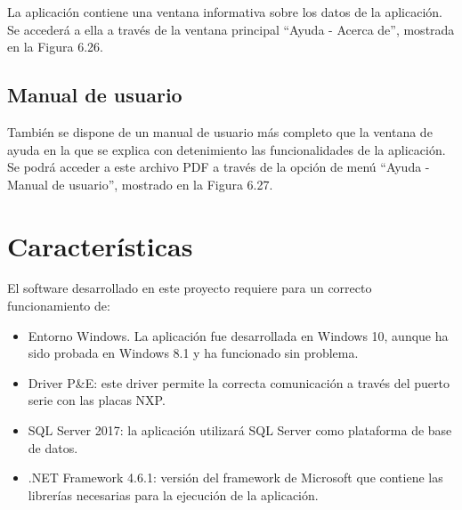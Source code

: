 La aplicación contiene una ventana informativa sobre los datos de la aplicación. Se accederá a ella a través de la ventana principal ``Ayuda - Acerca de'', mostrada en la Figura 6.26.


\subsection{Manual de usuario}

También se dispone de un manual de usuario más completo que la ventana de ayuda en la que se explica con detenimiento las funcionalidades de la aplicación. Se podrá acceder a este archivo PDF a través de la opción de menú ``Ayuda - Manual de usuario'', mostrado en la Figura 6.27.


\section{Características}

El software desarrollado en este proyecto requiere para un correcto funcionamiento de:
\begin{itemize}
	\item Entorno Windows. La aplicación fue desarrollada en Windows 10, aunque ha sido probada en Windows 8.1 y ha funcionado sin problema.
	\item Driver P\&E: este driver permite la correcta comunicación a través del puerto serie con las placas NXP.
	\item SQL Server 2017: la aplicación utilizará SQL Server como plataforma de base de datos.
	\item .NET Framework 4.6.1: versión del framework de Microsoft que contiene las librerías necesarias para la ejecución de la aplicación.
\end{itemize}